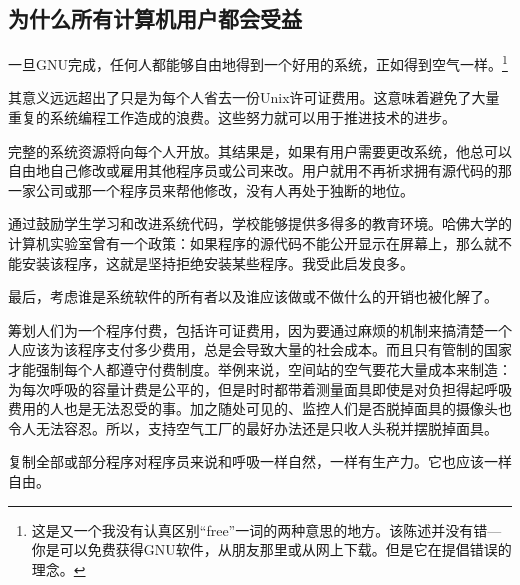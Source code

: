 \subsection{为什么所有计算机用户都会受益}
一旦GNU完成，任何人都能够自由地得到一个好用的系统，正如得到空气一样。\footnote{这是又一个我没有认真区别“free”一词的两种意思的地方。该陈述并没有错—你是可以免费获得GNU软件，从朋友那里或从网上下载。但是它在提倡错误的理念。}\par
其意义远远超出了只是为每个人省去一份Unix许可证费用。这意味着避免了大量重复的系统编程工作造成的浪费。这些努力就可以用于推进技术的进步。\par
完整的系统资源将向每个人开放。其结果是，如果有用户需要更改系统，他总可以自由地自己修改或雇用其他程序员或公司来改。用户就用不再祈求拥有源代码的那一家公司或那一个程序员来帮他修改，没有人再处于独断的地位。\par
通过鼓励学生学习和改进系统代码，学校能够提供多得多的教育环境。哈佛大学的计算机实验室曾有一个政策：如果程序的源代码不能公开显示在屏幕上，那么就不能安装该程序，这就是坚持拒绝安装某些程序。我受此启发良多。\par
最后，考虑谁是系统软件的所有者以及谁应该做或不做什么的开销也被化解了。\par
筹划人们为一个程序付费，包括许可证费用，因为要通过麻烦的机制来搞清楚一个人应该为该程序支付多少费用，总是会导致大量的社会成本。而且只有管制的国家才能强制每个人都遵守付费制度。举例来说，空间站的空气要花大量成本来制造：为每次呼吸的容量计费是公平的，但是时时都带着测量面具即使是对负担得起呼吸费用的人也是无法忍受的事。加之随处可见的、监控人们是否脱掉面具的摄像头也令人无法容忍。所以，支持空气工厂的最好办法还是只收人头税并摆脱掉面具。\par
复制全部或部分程序对程序员来说和呼吸一样自然，一样有生产力。它也应该一样自由。\par
